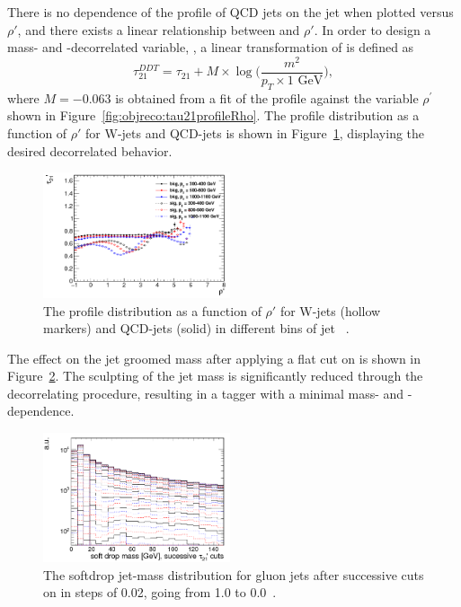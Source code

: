 There is no dependence of the \nsubj profile of QCD jets on the jet \PT when plotted versus $\rho'$, and there exists a linear relationship between \nsubj and $\rho'$. In order to design a mass- and \PT-decorrelated \nsubj variable, \ddt, a linear transformation of \nsubj is defined as
\begin{equation}
\label{eq:searchII:ddt}
\tau_{21}^{DDT} = \tau_{21} + M \times \log \bigg( \frac{m^2}{p_T \times 1 \textrm{ GeV}}\bigg),
\end{equation}
where $M=-0.063$ is obtained from a fit of the \nsubj profile against the variable $\rho^{'}$ shown in Figure~\ref{fig:objreco:tau21profileRho}. The \ddt profile distribution as a function of $\rho'$ for W-jets and QCD-jets is shown in Figure~\ref{fig:objreco:tau21ddtprofileRho}, displaying the desired decorrelated behavior.
\begin{figure}[h!] 
    \centering 
    \includegraphics[width=0.49\textwidth]{figures/event_reconstruction/rho_vs_tau21ddt.png}
     \caption{The \ddt profile distribution as a function of $\rho'$ for W-jets (hollow markers) and QCD-jets (solid) in different bins of jet \PT~\cite{Dolen:2016kst}.}
     \label{fig:objreco:tau21ddtprofileRho}
 \end{figure}
The effect on the jet groomed mass after applying a flat cut on \ddt is shown in Figure~\ref{fig:objreco:sculptDDT}. The sculpting of the jet mass is significantly reduced through the decorrelating procedure, resulting in a tagger with a minimal mass- and \PT-dependence.
\begin{figure}[h!] 
    \centering 
    \includegraphics[width=0.49\textwidth]{figures/event_reconstruction/sdmassvsddt.png}
     \caption{The softdrop jet-mass distribution for gluon jets after successive cuts on \ddt in steps of 0.02, going from 1.0 to 0.0~\cite{Dolen:2016kst}.}
     \label{fig:objreco:sculptDDT}
 \end{figure}
\clearpage
